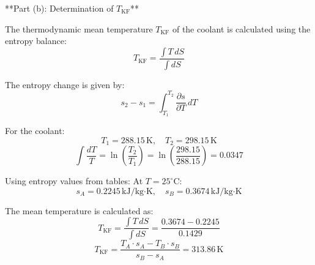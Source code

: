 **Part (b): Determination of \( T_{\text{KF}} \)**  

The thermodynamic mean temperature \( T_{\text{KF}} \) of the coolant is calculated using the entropy balance:  
\[
T_{\text{KF}} = \frac{\int T \, dS}{\int dS}
\]  

The entropy change is given by:  
\[
s_2 - s_1 = \int_{T_1}^{T_2} \frac{\partial s}{\partial T} \, dT
\]  

For the coolant:  
\[
T_1 = 288.15 \, \text{K}, \quad T_2 = 298.15 \, \text{K}
\]  
\[
\int \frac{dT}{T} = \ln \left( \frac{T_2}{T_1} \right) = \ln \left( \frac{298.15}{288.15} \right) = 0.0347
\]  

Using entropy values from tables:  
At \( T = 25^\circ\text{C} \):  
\[
s_A = 0.2245 \, \text{kJ/kg·K}, \quad s_B = 0.3674 \, \text{kJ/kg·K}
\]  

The mean temperature is calculated as:  
\[
T_{\text{KF}} = \frac{\int T \, dS}{\int dS} = \frac{0.3674 - 0.2245}{0.1429}
\]  
\[
T_{\text{KF}} = \frac{T_A \cdot s_A - T_B \cdot s_B}{s_B - s_A} = 313.86 \, \text{K}
\]